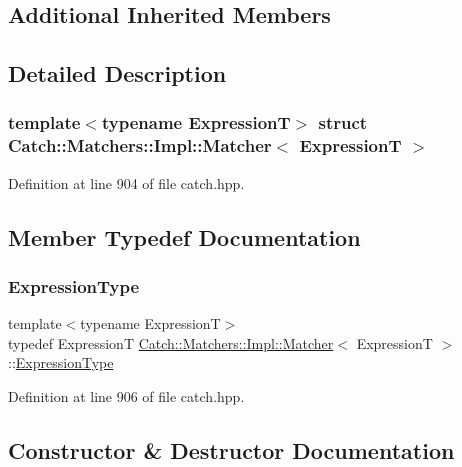 \subsection*{Additional Inherited Members}


\subsection{Detailed Description}
\subsubsection*{template$<$typename ExpressionT$>$\newline
struct Catch\+::\+Matchers\+::\+Impl\+::\+Matcher$<$ Expression\+T $>$}



Definition at line 904 of file catch.\+hpp.



\subsection{Member Typedef Documentation}
\hypertarget{struct_catch_1_1_matchers_1_1_impl_1_1_matcher_a7f5068cbacd1eed06cf243e63446e7e1}{}\label{struct_catch_1_1_matchers_1_1_impl_1_1_matcher_a7f5068cbacd1eed06cf243e63446e7e1} 
\subsubsection{\texorpdfstring{Expression\+Type}{ExpressionType}}
{\footnotesize\ttfamily template$<$typename ExpressionT$>$ \\
typedef ExpressionT \hyperlink{struct_catch_1_1_matchers_1_1_impl_1_1_matcher}{Catch\+::\+Matchers\+::\+Impl\+::\+Matcher}$<$ ExpressionT $>$\+::\hyperlink{struct_catch_1_1_matchers_1_1_impl_1_1_matcher_a7f5068cbacd1eed06cf243e63446e7e1}{Expression\+Type}}



Definition at line 906 of file catch.\+hpp.



\subsection{Constructor \& Destructor Documentation}
\hypertarget{struct_catch_1_1_matchers_1_1_impl_1_1_matcher_a55e537214a78bbba59f53d3e30336a61}{}\label{struct_catch_1_1_matchers_1_1_impl_1_1_matcher_a55e537214a78bbba59f53d3e30336a61} 
